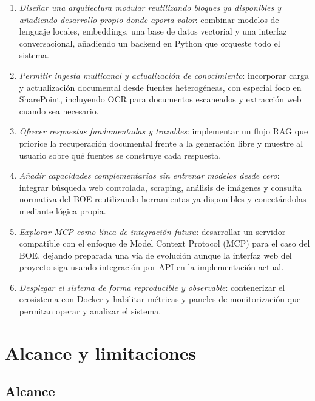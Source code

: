 \begin{enumerate}
    \item \textit{Diseñar una arquitectura modular reutilizando bloques ya disponibles y añadiendo desarrollo propio donde aporta valor}: combinar modelos de lenguaje locales, embeddings, una base de datos vectorial y una interfaz conversacional, añadiendo un backend en Python que orqueste todo el sistema.

    \item \textit{Permitir ingesta multicanal y actualización de conocimiento}: incorporar carga y actualización documental desde fuentes heterogéneas, con especial foco en SharePoint, incluyendo OCR para documentos escaneados y extracción web cuando sea necesario.

    \item \textit{Ofrecer respuestas fundamentadas y trazables}: implementar un flujo RAG que priorice la recuperación documental frente a la generación libre y muestre al usuario sobre qué fuentes se construye cada respuesta.

    \item \textit{Añadir capacidades complementarias sin entrenar modelos desde cero}: integrar búsqueda web controlada, scraping, análisis de imágenes y consulta normativa del BOE reutilizando herramientas ya disponibles y conectándolas mediante lógica propia.

    \item \textit{Explorar MCP como línea de integración futura}: desarrollar un servidor compatible con el enfoque de Model Context Protocol (MCP) \cite{anthropic2024mcp} para el caso del BOE, dejando preparada una vía de evolución aunque la interfaz web del proyecto siga usando integración por API en la implementación actual.

    \item \textit{Desplegar el sistema de forma reproducible y observable}: contenerizar el ecosistema con Docker y habilitar métricas y paneles de monitorización que permitan operar y analizar el sistema.
\end{enumerate}

\section{Alcance y limitaciones}

\subsection{Alcance}


